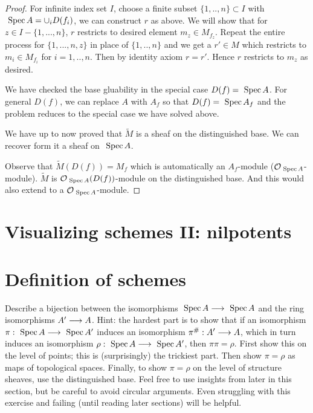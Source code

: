\documentclass[11pt]{book} %
\begin{document}
\begin{proof}
For infinite index set $I$, choose a finite subset $\{1,..,n\}\subset I$ with $\text{ Spec\,} A=\cup_i D(f_i)$, we can construct $r$ as above. We will show that for $z\in I-\{1,...,n\}$, $r$ restricts to desired element $m_z\in M_{f_z}$. Repeat the entire process for $\{1,...,n,z\}$ in place of $\{1,..,n\}$ and we get a $r'\in M$ which restricts to $m_i\in M_{f_i}$ for $i=1,..,n$. Then by identity axiom $r=r'$. Hence $r$ restricts to $m_z$ as desired.

We have checked the base gluability in the special case $D(f)=\text{ Spec\,} A$. For general $D(f)$, we can replace $A$ with $A_f$ so that $D(f)=\text{ Spec\,} A_f$ and the problem reduces to the special case we have solved above.

We have up to now proved that $\tilde{M}$ is a sheaf on the distinguished base. We can recover form it a sheaf on $\text{ Spec\,} A$.

Observe that $\tilde{M}(D(f))=M_f$ which is automatically an $A_f$-module (${\cal O}_{\text{ Spec\,} A}$-module). $\tilde{M}$ is ${\cal O}_{\text{ Spec\,} A}(D(f))$-module on the distinguished base. And this would also extend to a ${\cal O}_{\text{ Spec\,} A}$-module.
\end{proof}





\section{Visualizing schemes II: nilpotents}
\section{Definition of schemes
}

\begin{exr}
Describe a bijection between the isomorphisms $\text{ Spec\,} A \longrightarrow \text{ Spec\,} A$ and the ring isomorphisms $A' \longrightarrow A$. Hint: the hardest part is to show that if an isomorphism $\pi: \text{ Spec\,} A\longrightarrow \text{ Spec\,} A'$ induces an isomorphism $\pi^\#:A' \longrightarrow A$, which in turn induces an isomorphism $\rho: \text{ Spec\,} A \longrightarrow  \text{ Spec\,} A'$, then $π\pi = \rho$. First show this on the level of points; this is (surprisingly) the trickiest part. Then show $\pi = \rho$ as maps of topological spaces. Finally, to show $\pi = \rho$ on the level of structure sheaves, use the distinguished base. Feel free to use insights from later in this section, but be careful to avoid circular arguments. Even struggling with this exercise and failing (until reading later sections) will be helpful.
\end{exr}
\end{document}
